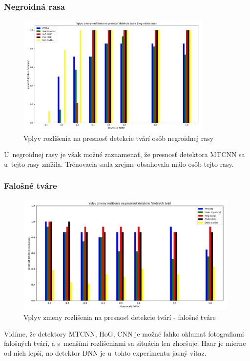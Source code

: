 \documentclass[]{article}
\begin{document}
	\subsubsection*{Negroidná rasa}
	\begin{figure}[h!]
		\includegraphics[height=6cm,width=\textwidth]{Vysledky_rozslisenie/negro/Figure_1.png}
		\caption{Vplyv rozlíšenia na presnosť detekcie tvárí osôb negroidnej rasy}
	\end{figure}

	\newpage
	U~negroidnej rasy je však možné zaznamenať, že presnosť detektora MTCNN sa u~tejto rasy znížila. Trénovacia sada zrejme obsahovala málo osôb tejto rasy.
	
	\subsubsection*{Falošné tváre}
	\begin{figure}[h!]
		\includegraphics[height=6cm,width=\textwidth]{Vysledky_rozslisenie/fake/Figure_1.png}
		\caption{Vplyv zmeny rozlíšenia na presnosť detekcie tvárí - falošné tváre}
	\end{figure}

	Vidíme, že detektory MTCNN, HoG, CNN je možné ľahko oklamať fotografiami falošných tvárí, a s~menšími rozlíšeniami sa situácia len zhoršuje. Haar je mierne od nich lepší, no detektor DNN je u~tohto experimentu jasný vítaz.
	
\end{document}
